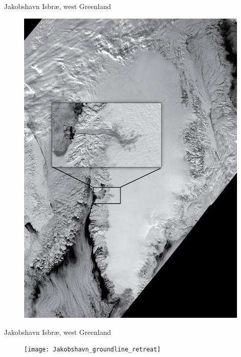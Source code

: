 \documentclass[intlimits]{beamer}
\begin{document}
\begin{frame}{Jakobshavn Isbr{\ae}, west Greenland}
 \begin{figure}
    \hspace{2cm}
 \includegraphics[height=0.85\textheight]{MODISGreenlandJakobshavn}  \quad  {}
  \end{figure}
\end{frame}


\begin{frame}{Jakobshavn Isbr{\ae}, west Greenland}
 \begin{figure}
    \texttt{[image: Jakobshavn\_groundline\_retreat]} \\
  \end{figure}
\end{frame}
\end{document}
